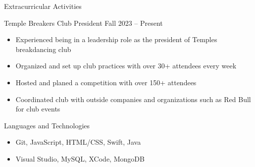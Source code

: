 \documentclass[]{mcdowellcv}
\begin{document}
	
	\begin{cvsection}{Extracurricular Activities}
		\begin{cvsubsection}{Temple Breakers Club President}{}{ Fall 2023 -- Present}	
			\begin{itemize}
				\item Experienced being in a leadership role as the president of Temples breakdancing club
				\item Organized and set up club practices with over 30+ attendees every week
				\item Hosted and planed a competition with over 150+ attendees
				\item Coordinated club with outside companies and organizations such as Red Bull for club events
			\end{itemize}
		\end{cvsubsection}
	\end{cvsection}



	
	\begin{cvsection}{Languages and Technologies}
		\begin{cvsubsection}{}{}{}	
			\begin{itemize}
				\item Git, JavaScript, HTML/CSS, Swift, Java
				\item Visual Studio, MySQL, XCode, MongoDB
			\end{itemize}
		\end{cvsubsection}
	\end{cvsection}
	
\end{document}
